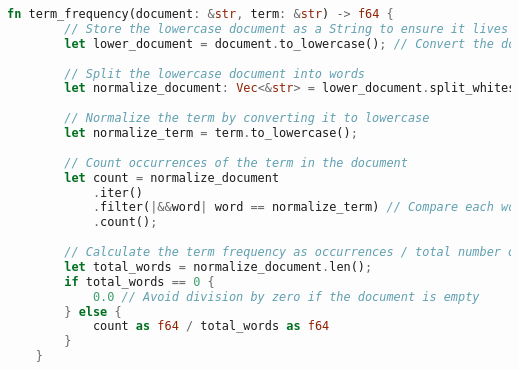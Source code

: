 \documentclass[a4paper,12pt]{article}
\begin{document}
\begin{lstlisting}[language=Rust]
    fn term_frequency(document: &str, term: &str) -> f64 {
        // Store the lowercase document as a String to ensure it lives long enough
        let lower_document = document.to_lowercase(); // Convert the document to lowercase
    
        // Split the lowercase document into words
        let normalize_document: Vec<&str> = lower_document.split_whitespace().collect();
    
        // Normalize the term by converting it to lowercase
        let normalize_term = term.to_lowercase();
    
        // Count occurrences of the term in the document
        let count = normalize_document
            .iter()
            .filter(|&&word| word == normalize_term) // Compare each word with the term
            .count();
    
        // Calculate the term frequency as occurrences / total number of words
        let total_words = normalize_document.len();
        if total_words == 0 {
            0.0 // Avoid division by zero if the document is empty
        } else {
            count as f64 / total_words as f64
        }
    }
\end{lstlisting}
\end{document}
